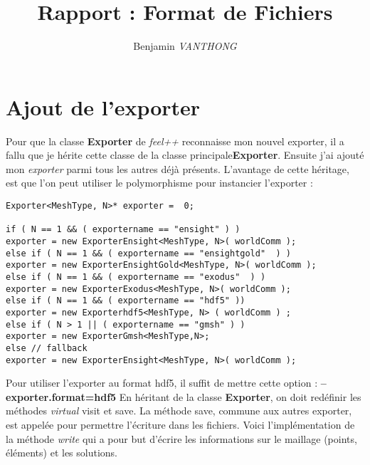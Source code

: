 \documentclass[10pt]{article}
\title {Rapport : Format de Fichiers}
\author {Benjamin \emph{VANTHONG}}
\begin{document}
\maketitle 
\section {Ajout de l'exporter}
Pour que la classe \textbf{Exporter} de \emph{feel++} reconnaisse mon nouvel exporter, il a fallu que je hérite cette classe de la classe principale\textbf{Exporter}. Ensuite j'ai ajouté mon \emph{exporter} parmi tous les autres déjà présents. L'avantage de cette héritage, est que l'on peut utiliser le polymorphisme pour instancier l'exporter : 
\begin{lstlisting}
Exporter<MeshType, N>* exporter =  0;

if ( N == 1 && ( exportername == "ensight" ) )
exporter = new ExporterEnsight<MeshType, N>( worldComm );
else if ( N == 1 && ( exportername == "ensightgold"  ) )
exporter = new ExporterEnsightGold<MeshType, N>( worldComm );
else if ( N == 1 && ( exportername == "exodus"  ) )
exporter = new ExporterExodus<MeshType, N>( worldComm );
else if ( N == 1 && ( exportername == "hdf5" ))
exporter = new Exporterhdf5<MeshType, N> ( worldComm ) ;
else if ( N > 1 || ( exportername == "gmsh" ) )
exporter = new ExporterGmsh<MeshType,N>;
else // fallback
exporter = new ExporterEnsight<MeshType, N>( worldComm );
\end{lstlisting}
Pour utiliser l'exporter au format hdf5, il suffit de mettre cette option : \textbf{--exporter.format=hdf5}\newline 
En héritant de la classe \textbf{Exporter}, on doit redéfinir les méthodes \emph{virtual} visit et save. La méthode save, commune aux autres exporter, est appelée pour permettre l'écriture dans les fichiers.\newline
Voici l'implémentation de la méthode \emph{write} qui a pour but d'écrire les informations sur le maillage (points, éléments) et les solutions.
\end{document}
